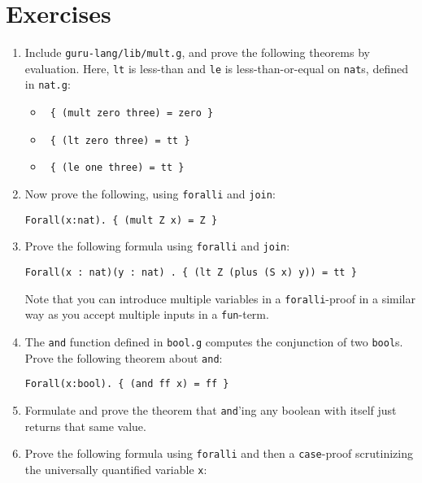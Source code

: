 \documentclass{book}[12pt]
\begin{document}
\section{Exercises}

\begin{enumerate}

\item Include \texttt{guru-lang/lib/mult.g}, and prove the following
theorems by evaluation.  Here, \texttt{lt} is less-than and \texttt{le}
is less-than-or-equal on \texttt{nat}s, defined in \texttt{nat.g}:
\begin{itemize}
\item \texttt{ \{ (mult zero three) = zero \}}
\item \texttt{ \{ (lt zero three) = tt \}}
\item \texttt{ \{ (le one three) = tt \}}
\end{itemize}

\item Now prove the following, using \texttt{foralli} and \texttt{join}:
\begin{verbatim}
Forall(x:nat). { (mult Z x) = Z }
\end{verbatim}

\item Prove the following formula using \texttt{foralli} and
\texttt{join}:

\begin{verbatim}
Forall(x : nat)(y : nat) . { (lt Z (plus (S x) y)) = tt }
\end{verbatim}

\noindent Note that you can introduce multiple variables in a
\texttt{foralli}-proof in a similar way as you accept multiple inputs
in a \texttt{fun}-term.

\item The \texttt{and} function defined in \texttt{bool.g} computes
the conjunction of two \texttt{bool}s.  Prove the following theorem
about \texttt{and}:

\begin{verbatim}
Forall(x:bool). { (and ff x) = ff }
\end{verbatim}

\item Formulate and prove the theorem that \texttt{and}'ing any
boolean with itself just returns that same value.

\item Prove the following formula using \texttt{foralli} and
then a \texttt{case}-proof scrutinizing the universally quantified 
variable \texttt{x}:


\end{enumerate}
\end{document}
